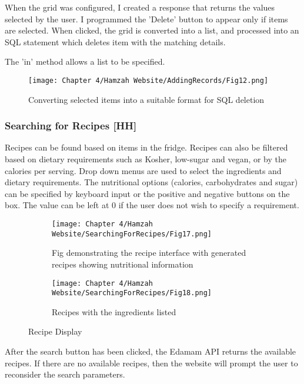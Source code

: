 When the grid was configured, I created a response that returns the values selected by the user.
I programmed the 'Delete' button to appear only if items are selected.
When clicked, the grid is converted into a list, and processed into an SQL statement which deletes item with the matching details.

The 'in' method allows a list to be specified.

\begin{figure}[H]        
    \centering
    \texttt{[image: Chapter 4/Hamzah Website/AddingRecords/Fig12.png]}
    \caption{Converting selected items into a suitable format for SQL deletion}
\end{figure} 

\subsubsection{Searching for Recipes [HH]}

Recipes can be found based on items in the fridge.
Recipes can also be filtered based on dietary requirements such as Kosher, low-sugar and vegan, or by the calories per serving.
Drop down menus are used to select the ingredients and dietary requirements.
The nutritional options (calories, carbohydrates and sugar) can be specified by keyboard input or the positive and negative buttons on the box.
The  value can be left at 0 if the user does not wish to specify a requirement.

\begin{figure}[H]
    \begin{subfigure}{.5\textwidth}
        \centering
        \texttt{[image: Chapter 4/Hamzah Website/SearchingForRecipes/Fig17.png]}
        \caption{Fig demonstrating the recipe interface with generated recipes showing nutritional information}
    \end{subfigure}%
    \begin{subfigure}{.5\textwidth}
        \centering
        \texttt{[image: Chapter 4/Hamzah Website/SearchingForRecipes/Fig18.png]}
        \caption{Recipes with the ingredients listed}
    \end{subfigure}
    \caption{Recipe Display}
\end{figure}

After the search button has been clicked, the Edamam API returns the available recipes.
If there are no available recipes, then the website will prompt the user to reconsider the search parameters.

